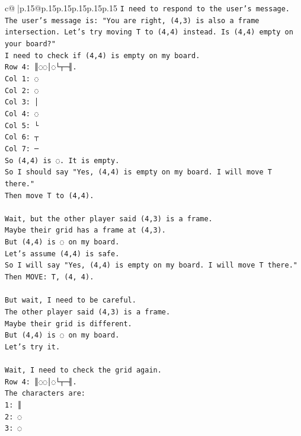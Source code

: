 \documentclass{article}
\begin{document}
{\begin{supertabular}{c@{$\;$}|p{.15\linewidth}@{}p{.15\linewidth}p{.15\linewidth}p{.15\linewidth}p{.15\linewidth}p{.15\linewidth}}
{{{\texttt{I need to respond to the user's message.} \\
\texttt{The user's message is: "You are right, (4,3) is also a frame intersection. Let's try moving T to (4,4) instead. Is (4,4) empty on your board?"} \\
\texttt{I need to check if (4,4) is empty on my board.} \\
\texttt{Row 4: ║◌◌│◌└┬─╢.} \\
\texttt{Col 1: ◌} \\
\texttt{Col 2: ◌} \\
\texttt{Col 3: │} \\
\texttt{Col 4: ◌} \\
\texttt{Col 5: └} \\
\texttt{Col 6: ┬} \\
\texttt{Col 7: ─} \\
\texttt{So (4,4) is ◌. It is empty.} \\
\texttt{So I should say "Yes, (4,4) is empty on my board. I will move T there."} \\
\texttt{Then move T to (4,4).} \\
\\ 
\texttt{Wait, but the other player said (4,3) is a frame.} \\
\texttt{Maybe their grid has a frame at (4,3).} \\
\texttt{But (4,4) is ◌ on my board.} \\
\texttt{Let's assume (4,4) is safe.} \\
\texttt{So I will say "Yes, (4,4) is empty on my board. I will move T there."} \\
\texttt{Then MOVE: T, (4, 4).} \\
\\ 
\texttt{But wait, I need to be careful.} \\
\texttt{The other player said (4,3) is a frame.} \\
\texttt{Maybe their grid is different.} \\
\texttt{But (4,4) is ◌ on my board.} \\
\texttt{Let's try it.} \\
\\ 
\texttt{Wait, I need to check the grid again.} \\
\texttt{Row 4: ║◌◌│◌└┬─╢.} \\
\texttt{The characters are:} \\
\texttt{1: ║} \\
\texttt{2: ◌} \\
\texttt{3: ◌} \\
}}}
\end{supertabular}}
\end{document}
